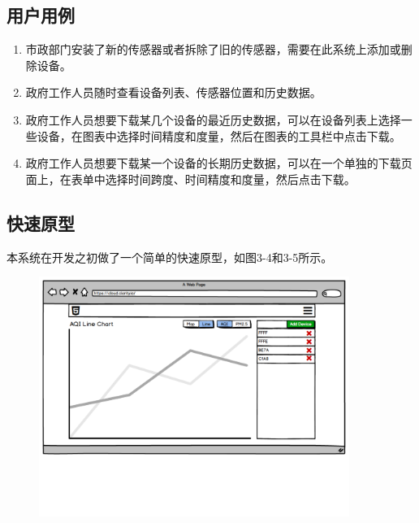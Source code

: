 \subsection{用户用例}
\begin{enumerate}
  \item 市政部门安装了新的传感器或者拆除了旧的传感器，需要在此系统上添加或删除设备。
  \item 政府工作人员随时查看设备列表、传感器位置和历史数据。
  \item 政府工作人员想要下载某几个设备的最近历史数据，可以在设备列表上选择一些设备，在图表中选择时间精度和度量，然后在图表的工具栏中点击下载。
  \item 政府工作人员想要下载某一个设备的长期历史数据，可以在一个单独的下载页面上，在表单中选择时间跨度、时间精度和度量，然后点击下载。
\end{enumerate}

\subsection{快速原型}
本系统在开发之初做了一个简单的快速原型，如图3-4和3-5所示。
\begin{figure}[!htp]
 \centering
 \includegraphics[width=0.9\textwidth]{pdf/azwraith_prototype.pdf}
\end{figure}

